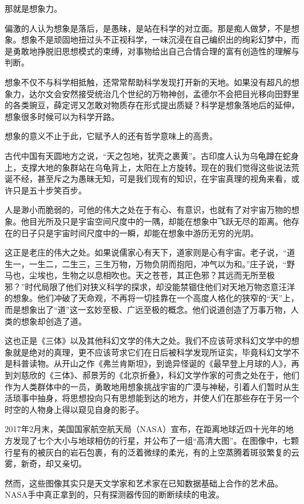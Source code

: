 \documentclass[openany,scheme = chinese, linespread = 1.5]{ctexbook}
\begin{document}
那就是想象力。

偏激的人认为想象是落后，是愚昧，是站在科学的对立面。那是痴人做梦，不是想象。想象不是顽固地扭过头不正视科学，一味沉浸在自己编织出的绚彩幻梦中，而是勇敢地挣脱旧思想模式的束缚，对事物给出自己合情合理的富有创造性的理解与判断。

想象不仅不与科学相抵触，还常常帮助科学发现打开新的天地。如果没有超凡的想象力，达尔文会安然接受统治几个世纪的万物神创，孟德尔不会把目光移向田野里的各类豌豆，薛定谔又怎敢对物质存在形式提出质疑？科学是想象落地后的延伸，想象很多时候可以为科学开路。

想象的意义不止于此，它赋予人的还有哲学意味上的高贵。

古代中国有天圆地方之说，“天之包地，犹壳之裹黄”。古印度人认为乌龟蹲在蛇身上，支撑大地的象群站在乌龟背上，太阳在上方旋转。现在的我们觉得这些说法荒诞不经，甚至斥之为愚昧无知，可是我们现有的知识，在宇宙真理的视角来看，或许只是五十步笑百步。

人是渺小而脆弱的，可他的伟大之处在于有心、有意识，也就有了对宇宙万物的想象。他目光所及只是宇宙空间尺度中的一隅，却能在想象中飞跃无尽的距离。他存在的日子只是宇宙时间尺度中的一瞬，却能在想象中游历无穷的光阴。

这正是老庄的伟大之处。如果说儒家心有天下，道家则是心有宇宙。老子说，“道生一，一生二，二生三，三生万物，万物负阴而抱阳，冲气以为和。”庄子说，“野马也，尘埃也，生物之以息相吹也。天之苍苍，其正色邪？其远而无所至极邪？”时代局限了他们对狭义科学的探求，却没能禁锢住他们对天地万物恣意汪洋的想象。他们冲破了天命观，不再将一切挂靠在一个高度人格化的狭窄的“天”上，而是想象出了“道”这一玄妙至极、广远至极的概念。他们说道创造了万事万物，人类的想象却创造了道。

这也正是《三体》以及其他科幻文学的伟大之处。我们不应该苛求科幻文学中的想象就是绝对的真理，更不应该苛求它们在日后被科学发现所证实，毕竟科幻文学不是科普读物。从开山之作《弗兰肯斯坦》，到诡异怪诞的《最早登上月球的人》，再到刘慈欣的《三体》、郝景芳的《北京折叠》，科幻文学作家的可贵之处在于，他们作为人类群体中的一员，勇敢地用想象挑战宇宙的广漠与神秘，引着人们暂时从生活琐事中抽身，将思想投向只有思想能到达的地方，并使人们在那些存在于另一个时空的人物身上得以窥见自身的影子。

2017年2月末，美国国家航空航天局（NASA）宣布，在距离地球近四十光年的地方发现了七个大小与地球相仿的行星，并公布了一组“高清大图”。在图像中，七颗行星有的被灰白的岩石包裹，有的泛着微绿的柔光，有的上空蒸腾着斑驳繁复的云雾，新奇，却又亲切。

然而，这些图像其实只是天文学家和艺术家在已知数据基础上合作的艺术品。NASA手中真正拿到的，只有探测器传回的断断续续的电波。
\end{document}
